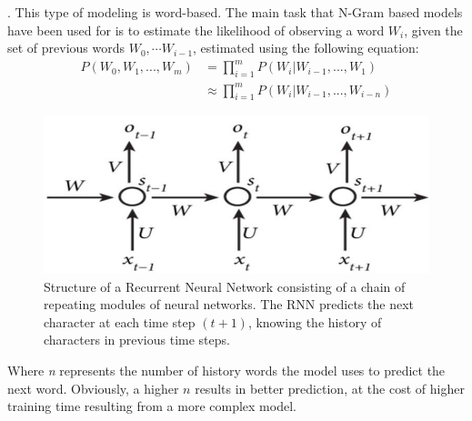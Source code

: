 . 
This type of modeling is word-based.
The main task that N-Gram based models \citep{brown1992class} have been used for is to estimate the likelihood of observing a word \textit{$W_i$}, given the set of previous words ${W_0, \cdots W_{i-1}}$, estimated using the following equation:
\newline
\begin{equation}
\begin{aligned}
  P(W_0, W_1, ..., W_{m}) &= \prod_{i=1}^{m}  P(W_{i} |  W_{i-1}, ..., W_{1}) \\
  &\approx \prod_{i=1}^{m}  P(W_{i} |  W_{i-1}, ..., W_{i-n})
  \end{aligned}
\end{equation}
\begin{figure}
  \includegraphics[width=\linewidth]{figs/Background_RNN}
  \caption{Structure of a Recurrent Neural Network consisting of a chain of repeating modules of neural networks. The RNN predicts the next character at each time step $(t+1)$, knowing the history of characters in previous time steps.}
\label{fig:RNN}
\end{figure}
Where \textit{n} represents the number of history words the model uses to predict the next word. Obviously, a higher $n$ results in better prediction, at the cost of higher training time resulting from a more complex model.  

